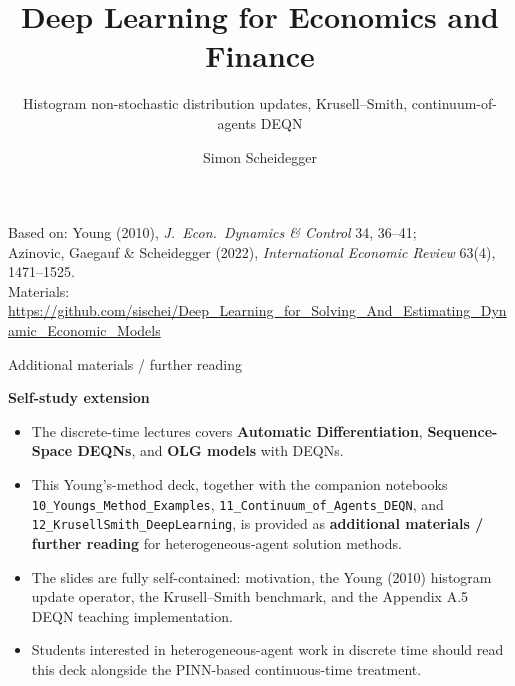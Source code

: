 \documentclass[aspectratio=169,11pt]{beamer}
\title[Deep Learning for Dynamic Economic Models]
{Deep Learning for Economics and Finance}
\subtitle{Histogram non-stochastic distribution updates, Krusell--Smith, continuum-of-agents DEQN}
\author{Simon Scheidegger}
\institute[HEC Lausanne]{HEC, University of Lausanne}
\date{}
\begin{document}
\newcommand{\exercisepause}{%
  \tikz[baseline=(X.base)]{\node[fill=darkgreen!80!black, text=white,
  rounded corners=2pt, inner sep=3pt, font=\scriptsize\bfseries](X){PAUSE --- 5 min};}}



{
\begin{frame}
\titlepage
\vspace{-0.4cm}
\begin{center}
{\footnotesize Based on: Young (2010), \emph{J.\ Econ.\ Dynamics \& Control} 34, 36--41;\\
Azinovic, Gaegauf \& Scheidegger (2022), \emph{International Economic Review} 63(4), 1471--1525.}\\[4pt]
{\footnotesize Materials: \url{https://github.com/sischei/Deep_Learning_for_Solving_And_Estimating_Dynamic_Economic_Models}}
\end{center}
\end{frame}
}

{
\begin{frame}{\textcolor{uzhblue}{Additional materials / further reading}}
\vspace{0.2cm}
\begin{center}
{\LARGE\bfseries\color{uzhblue} Self-study extension}
\end{center}
\vspace{0.4cm}
\begin{itemize}\setlength\itemsep{0.3em}
    \item The discrete-time lectures covers \textbf{Automatic Differentiation}, \textbf{Sequence-Space DEQNs}, and \textbf{OLG models} with DEQNs.
    \item This Young's-method deck, together with the companion notebooks \texttt{10\_Youngs\_Method\_Examples}, \texttt{11\_Continuum\_of\_Agents\_DEQN}, and \texttt{12\_KrusellSmith\_DeepLearning}, is provided as \textbf{additional materials / further reading} for heterogeneous-agent solution methods.
    \item The slides are fully self-contained: motivation, the Young (2010) histogram update operator, the Krusell--Smith benchmark, and the Appendix A.5 DEQN teaching implementation.
    \item Students interested in heterogeneous-agent work in discrete time should read this deck alongside the PINN-based continuous-time treatment.
\end{itemize}
\end{frame}
}
\end{document}

